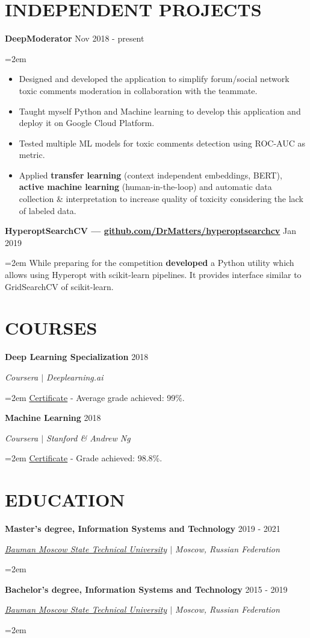 \documentclass{article}
\newcommand{\NewPart}[1]{\section*{{\color{gray}\uppercase{#1}}}}
\newcommand{\ExperienceEntry}[4]{
		\noindent \textbf{#1} \hfill  
		\hfill #2 \par  %
		\noindent \textit{#3} \par        %
		\noindent\hangindent=2em\hangafter=0 \small #4 %
		\normalsize \par}
\begin{document}
\NewPart{Independent Projects}{}
\ExperienceEntry
{DeepModerator}
{Nov 2018 - present}
{}
{\begin{itemize}
	\item{Designed and developed the application to simplify forum/social network toxic comments moderation in collaboration with the teammate.}
	\item{Taught myself Python and Machine learning to develop this application and deploy it on Google Cloud Platform.}
	\item{Tested multiple ML models for toxic comments detection using ROC-AUC as metric.}
	\item{Applied \textbf{transfer learning} (context independent embeddings, BERT), \textbf{active machine learning} (human-in-the-loop) and automatic data collection \& interpretation to increase quality of toxicity considering the lack of labeled data.}
\end{itemize}
}
\ExperienceEntry
{HyperoptSearchCV --- {\href{https://github.com/DrMatters/hyperoptsearchcv} {github.com/DrMatters/hyperoptsearchcv}}}
{Jan 2019}
{}
{
While preparing for the competition \textbf{developed} a Python utility which allows using Hyperopt with scikit-learn pipelines. It provides interface similar to GridSearchCV of scikit-learn.
}

\NewPart{Courses}{}
\ExperienceEntry
{Deep Learning Specialization}
{2018}
{Coursera $\vert$ Deeplearning.ai}
{\href{https://www.coursera.org/account/accomplishments/specialization/V5P6NWX4CR95} {Certificate} - Average grade achieved: 99\%.}
\ExperienceEntry
{Machine Learning}
{2018}
{Coursera $\vert$ Stanford \& Andrew Ng}
{\href{https://www.coursera.org/account/accomplishments/certificate/W2FV6BT5XCPF} {Certificate} - Grade achieved: 98.8\%.}

\NewPart{Education}{}
\ExperienceEntry
{Master's degree, Information Systems and Technology}
{2019 - 2021}
{\href{http://bmstu.ru/en}{Bauman Moscow State Technical University} $\vert$ Moscow, Russian Federation}
{}
\ExperienceEntry
{Bachelor's degree, Information Systems and Technology}
{2015 - 2019}
{\href{http://bmstu.ru/en}{Bauman Moscow State Technical University} $\vert$ Moscow, Russian Federation}
{}
\end{document}
